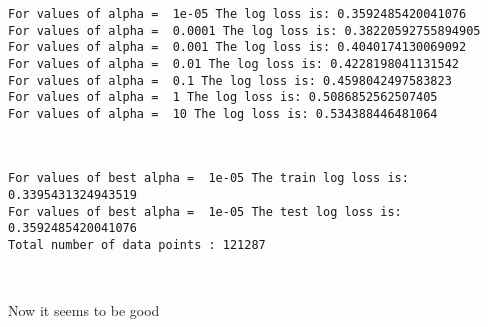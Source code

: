 \documentclass[11pt]{article}
\begin{document}
    \begin{Verbatim}[commandchars=\\\{\}]
For values of alpha =  1e-05 The log loss is: 0.3592485420041076
For values of alpha =  0.0001 The log loss is: 0.38220592755894905
For values of alpha =  0.001 The log loss is: 0.4040174130069092
For values of alpha =  0.01 The log loss is: 0.4228198041131542
For values of alpha =  0.1 The log loss is: 0.4598042497583823
For values of alpha =  1 The log loss is: 0.5086852562507405
For values of alpha =  10 The log loss is: 0.534388446481064

    \end{Verbatim}

    \begin{center}
    \end{center}
    { \hspace*{\fill} \\}
    
    \begin{Verbatim}[commandchars=\\\{\}]
For values of best alpha =  1e-05 The train log loss is: 0.3395431324943519
For values of best alpha =  1e-05 The test log loss is: 0.3592485420041076
Total number of data points : 121287

    \end{Verbatim}

    \begin{center}
    \end{center}
    { \hspace*{\fill} \\}
    
    Now it seems to be good
\end{document}
